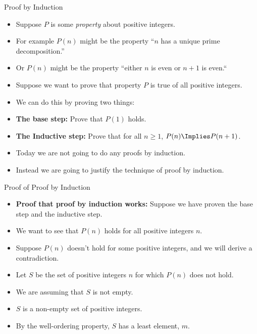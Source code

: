 \documentclass[handout]{beamer}
\begin{document}
\begin{frame}{Proof by Induction}
\begin{itemize}
  \item Suppose $P$ is some \emph{property} about positive integers.
  \item For example $P(n)$ might be the property ``$n$ has a unique prime decomposition.''
  \item Or $P(n)$ might be the property ``either $n$ is even or $n+1$ is even.``
  \item Suppose we want to prove that property $P$ is true of all positive integers.
  \item We can do this by proving two things:
  \item \textbf{The base step:} Prove that $P(1)$ holds.
  \item \textbf{The Inductive step:} Prove that for all $n\geq 1$, $P(n) \Implies P(n+1)$.
  \item Today we are not going to do any proofs by induction.
  \item Instead we are going to justify the technique of proof by induction.
\end{itemize}
\end{frame}

\begin{frame}{Proof of  Proof by Induction}
\begin{itemize}
  \item \textbf{Proof that proof by induction works:} Suppose we have proven the base step and the inductive step.
  \item We want to see that $P(n)$ holds for all positive integers $n$.
  \item Suppose $P(n)$ doesn't hold for some positive integers, and we will derive a contradiction.
  \item Let $S$ be the set of positive integers $n$ for which $P(n)$ does not hold.
  \item We are assuming that $S$ is not empty.
  \item $S$ is a non-empty set of positive integers.
  \item By the well-ordering property, $S$ has a least element, $m$.
\end{itemize}
\end{frame}
\end{document}
